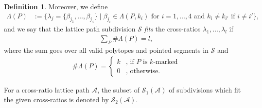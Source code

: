 \documentclass[11pt,reqno,a4]{amsart}
\theoremstyle{dotless}
\theoremstyle{definition}
\newtheorem{definition}[corollary]{Definition}
\begin{document}
\begin{definition}
Moreover, we define 
\begin{align*}
\Lambda(P)&:=\lbrace \lambda_j=\lbrace \beta_{j_1},\dots,\beta_{j_4}\rbrace\mid \beta_{j_i}\in\Lambda(P,k_i) \textrm{ for $i=1,\dots,4$ and $k_i\neq k_{i'}$ if $i\neq i'$} \rbrace,
\end{align*}
and we say that the lattice path subdivision $\mathcal{S}$ \textit{fits} the cross-ratios $\lambda_1,\dots,\lambda_l$ if
\begin{align*}
\sum_{P} \#\Lambda(P)=l,
\end{align*}
where the sum goes over all valid polytopes and pointed segments in $\mathcal{S}$ and
\begin{align*}
\#\Lambda(P)=
\begin{cases}
k & \textrm{, if $P$ is $k$-marked}\\
0 & \textrm{, otherwise.}
\end{cases}
\end{align*}
\end{definition}

For a cross-ratio lattice path $\mathcal{A}$, the subset of $\mathcal{S}_1(\mathcal{A})$ of subdivisions which fit the given cross-ratios is denoted  by $\mathcal{S}_2(\mathcal{A})$.
\end{document}
